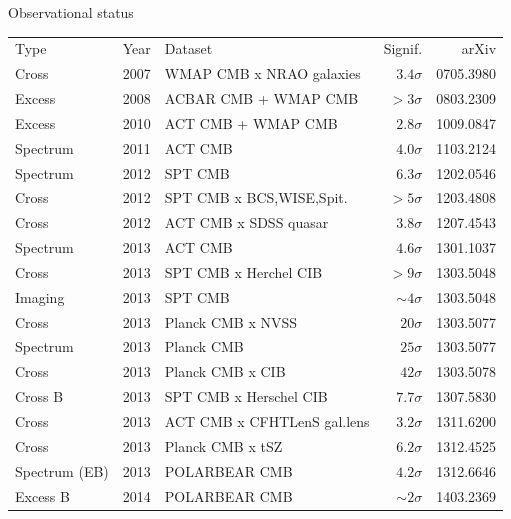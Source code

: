 \documentclass[table]{beamer}
\begin{document}
\begin{frame}{Observational status}
	\small
	\begin{tabular}{lrlrr}
		Type & Year & Dataset & Signif. &arXiv \\
		\rowcolor{red!25}   Cross     & 2007 &WMAP CMB x NRAO galaxies& $3.4\sigma$ &0705.3980  \\
		\rowcolor{green!25} Excess    & 2008 &ACBAR CMB + WMAP CMB    &  $>3\sigma$ &0803.2309  \\
		\rowcolor{green!25} Excess    & 2010 &ACT CMB + WMAP CMB      & $2.8\sigma$ &1009.0847  \\
		\rowcolor{blue!25}  Spectrum  & 2011 &ACT CMB                 & $4.0\sigma$ &1103.2124  \\
		\rowcolor{blue!25}  Spectrum  & 2012 &SPT CMB                 & $6.3\sigma$ &1202.0546  \\
		\rowcolor{red!25}   Cross     & 2012 &SPT CMB x BCS,WISE,Spit.&  $>5\sigma$ &1203.4808  \\
		\rowcolor{red!25}   Cross     & 2012 &ACT CMB x SDSS quasar   & $3.8\sigma$ &1207.4543  \\
		\rowcolor{blue!25}  Spectrum  & 2013 &ACT CMB                 & $4.6\sigma$ &1301.1037  \\
		\rowcolor{red!25}   Cross     & 2013 &SPT CMB x Herchel CIB   &  $>9\sigma$ &1303.5048  \\
		\rowcolor{yellow!25}Imaging   & 2013 &SPT CMB                &$\sim4\sigma$ &1303.5048  \\
		\rowcolor{red!25}   Cross     & 2013 &Planck CMB x NVSS       &  $20\sigma$ &1303.5077  \\
		\rowcolor{blue!25}  Spectrum  & 2013 &Planck CMB              &  $25\sigma$ &1303.5077  \\
		\rowcolor{red!25}   Cross     & 2013 &Planck CMB x CIB        &  $42\sigma$ &1303.5078  \\
		\rowcolor{orange!25}Cross B   & 2013 &SPT CMB x Herschel CIB  & $7.7\sigma$ &1307.5830  \\
		\rowcolor{red!25}   Cross     & 2013 &ACT CMB x CFHTLenS gal.lens& $3.2\sigma$ &1311.6200  \\
		\rowcolor{red!25}   Cross     & 2013 &Planck CMB x tSZ        & $6.2\sigma$ &1312.4525  \\
		\rowcolor{blue!25}  Spectrum (EB) & 2013 &POLARBEAR CMB           & $4.2\sigma$ &1312.6646  \\
		\rowcolor{green!25}  Excess B  & 2014 &POLARBEAR CMB          &$\sim2\sigma$ &1403.2369
	\end{tabular}
\end{frame}
\end{document}
